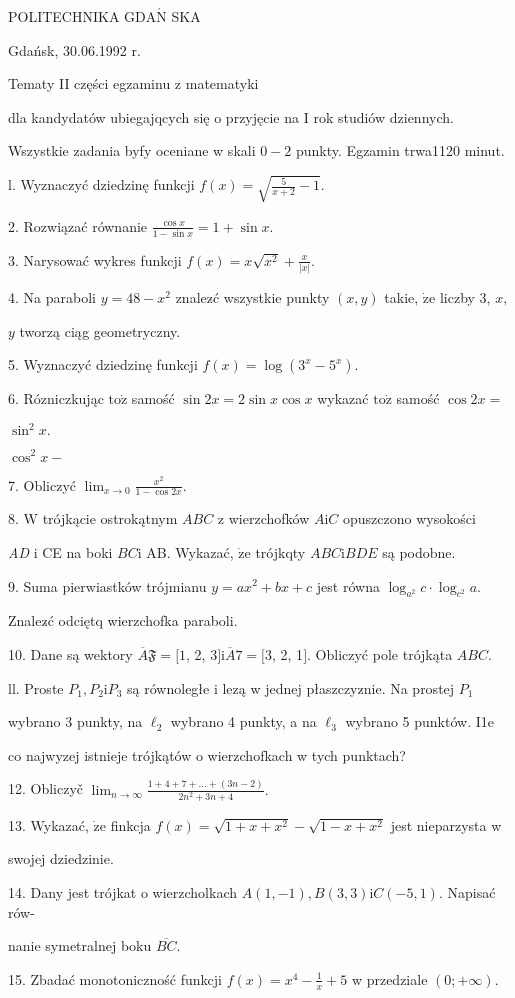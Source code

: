 \documentclass[a4paper,12pt]{article}
\begin{document}
POLITECHNIKA $\mathrm{G}\mathrm{D}\mathrm{A}\acute{\mathrm{N}}$ SKA

Gdańsk, 30.06.1992 r.

Tematy II części egzaminu z matematyki

dla kandydatów ubiegajqcych się o przyjęcie na I rok studiów dziennych.

Wszystkie zadania byfy oceniane w skali $0-2$ punkty. Egzamin trwa1120 minut.

l. Wyznaczyć dziedzinę funkcji $f(x)=\sqrt{\frac{5}{x+2}-1}.$

2. Rozwiązać równanie $\displaystyle \frac{\cos x}{1-\sin x}=1+\sin x.$

3. Narysować wykres funkcji $f(x)=x\displaystyle \sqrt{x^{2}}+\frac{x}{|x|}.$

4. Na paraboli $y=48-x^{2}$ znalez$\acute{}$ć wszystkie punkty $(x,y)$ takie, $\dot{\mathrm{z}}\mathrm{e}$ liczby 3, $x,$

$y$ tworzą ciąg geometryczny.

5. Wyznaczyć dziedzinę funkcji $f(x)=\log(3^{x}-5^{x}).$

6. Rózniczkując $\mathrm{t}\mathrm{o}\dot{\mathrm{z}}$ samość $\sin 2x=2\sin x\cos x$ wykazać $\mathrm{t}\mathrm{o}\dot{\mathrm{z}}$ samość $\cos 2x=$

$\sin^{2}x.$

$\cos^{2}x-$

7. Obliczyć $\displaystyle \lim_{x\rightarrow 0}\frac{x^{2}}{1-\cos 2x}.$

8. $\mathrm{W}$ trójkącie ostrokątnym $ABC$ z wierzchofków $A\mathrm{i}C$ opuszczono wysokości

{\it AD} $\mathrm{i}$ CE na boki $BC\mathrm{i}$ AB. Wykazać, $\dot{\mathrm{z}}\mathrm{e}$ trójkqty $ABC\mathrm{i}BDE$ są podobne.

9. Suma pierwiastków trójmianu $y = ax^{2}+bx+c$ jest równa $\log_{a^{2}}c\cdot\log_{c^{2}}a.$

Znalez$\acute{}$ć odciętq wierzchofka paraboli.

10. Dane są wektory $\overline{A}\mathfrak{F}=[1$, 2, 3$]\mathrm{i}\overline{A}7=[3$, 2, 1$]$. Obliczyć pole trójkąta $ABC.$

ll. Proste $P_{1}, P_{2} \mathrm{i}P_{3}$ są równoległe i lezą w jednej płaszczyz$\acute{}$nie. Na prostej $P_{1}$

wybrano 3 punkty, na $\ell_{2}$ wybrano 4 punkty, a na $\ell_{3}$ wybrano 5 punktów. I1e

co najwyzej istnieje trójkątów o wierzchofkach w tych punktach?

12. Obliczyč $\displaystyle \lim_{n\rightarrow\infty}\frac{1+4+7+\ldots+(3n-2)}{2n^{2}+3n+4}.$

13. Wykazać, $\dot{\mathrm{z}}\mathrm{e}$ finkcja $f(x) = \sqrt{1+x+x^{2}}-\sqrt{1-x+x^{2}}$ jest nieparzysta w

swojej dziedzinie.

14. Dany jest trójkat o wierzcholkach $A(1,-1), B(3,3)\mathrm{i}C(-5,1)$. Napisać rów-

nanie symetralnej boku $\overline{BC}.$

15. Zbadać monotoniczność funkcji $f(x)=x^{4}-\displaystyle \frac{1}{x}+5$ w przedziale $(0;+\infty).$
\end{document}
